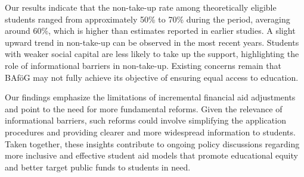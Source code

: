 Our results indicate that the non-take-up rate among theoretically eligible students ranged from approximately 50\% to 70\% during the period, averaging around 60\%, which is higher than estimates reported in earlier studies. 
A slight upward trend in non-take-up can be observed in the most recent years. 
Students with weaker social capital are less likely to take up the support, highlighting the role of informational barriers in non-take-up. 
Existing concerns remain that BAföG may not fully achieve its objective of ensuring equal access to education.


Our findings emphasize the limitations of incremental financial aid adjustments and point to the need for more fundamental reforms. 
Given the relevance of informational barriers, such reforms could involve simplifying the application procedures and providing clearer and more widespread information to students. 
Taken together, these insights contribute to ongoing policy discussions regarding more inclusive and effective student aid models that promote educational equity and better target public funds to students in need.


